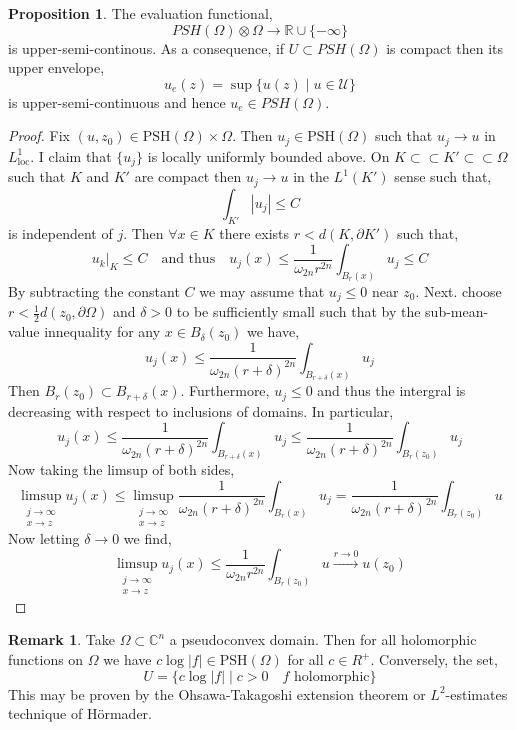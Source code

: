 \documentclass[12pt]{extarticle}
\newcommand{\R}{\mathbb{R}}
\newcommand{\C}{\mathbb{C}}
\theoremstyle{definition}
\newtheorem{proposition}[theorem]{Proposition}
\newtheorem{remark}{Remark}
\begin{document}
\begin{proposition}
The evaluation functional,
\[ PSH(\Omega) \otimes \Omega \to \R \cup \{ -\infty \} \]
is upper-semi-continous. As a consequence, if $U \subset PSH(\Omega)$ is compact then its upper envelope,
\[ u_e(z) = \sup \{ u(z) \mid u \in \mathcal{U} \} \]
is upper-semi-continuous and hence $u_e \in PSH(\Omega)$.  
\end{proposition}

\newcommand{\PSH}[1]{\mathrm{PSH}\left( #1 \right)}

\begin{proof}
Fix $(u, z_0) \in \PSH{\Omega} \times \Omega$. Then $u_j \in \PSH{\Omega}$ such that $u_j \to u$ in $L^1_{\text{loc}}$. I claim that $\{ u_j \}$ is locally uniformly bounded above. On $K \subset \subset K' \subset \subset \Omega$ such that $K$ and $K'$ are compact then $u_j \to u$ in the $L^1(K')$ sense such that,
\[ \int_{K'} |u_j| \le C \]
is independent of $j$. Then $\forall x \in K$ there exists $r < d(K, \partial K')$ such that,
\[ u_k|_K \le C \quad \text{and thus} \quad u_j(x) \le \frac{1}{\omega_{2n} r^{2n}} \int_{B_r(x)} u_j \le C \]
By subtracting the constant $C$ we may assume that $u_j \le 0$ near $z_0$. Next. choose $r < \tfrac{1}{2} d(z_0, \partial \Omega)$ and $\delta > 0$ to be sufficiently small such that by the sub-mean-value innequality for any $x \in B_\delta(z_0)$ we have,
\[ u_j(x) \le \frac{1}{\omega_{2n} (r + \delta)^{2n}} \int_{B_{r + \delta}(x)} u_j \] 
Then $B_r(z_0) \subset B_{r + \delta}(x)$. Furthermore, $u_j \le 0$ and thus the intergral is decreasing with respect to inclusions of domains. In particular,
\[ u_j(x) \le \frac{1}{\omega_{2n} (r + \delta)^{2n}} \int_{B_{r + \delta}(x)} u_j \le \frac{1}{\omega_{2n} (r + \delta)^{2n}} \int_{B_r(z_0)} u_j \] 
Now taking the limsup of both sides,
\[ \limsup_{\substack{j \to \infty \\ x \to z}} u_j(x) \le \limsup_{\substack{j \to \infty \\ x \to z}} \frac{1}{\omega_{2n} (r + \delta)^{2n}} \int_{B_r(x)} u_j = \frac{1}{\omega_{2n} (r + \delta)^{2n}} \int_{B_r(z_0)} u \]
Now letting $\delta \to 0$ we find,
\[ \limsup_{\substack{j \to \infty \\ x \to z}} u_j(x) \le \frac{1}{\omega_{2n} r^{2n}} \int_{B_r(z_0)} u \xrightarrow{r \to 0} u(z_0) \]
\end{proof}

\begin{remark}
Take $\Omega \subset \C^n$ a pseudoconvex domain. Then for all holomorphic functions on $\Omega$ we have $c \log{|f|} \in \PSH{\Omega}$ for all $c \in R^{+}$. Conversely, the set,
\[ U = \{ c \log{|f|} \mid c > 0 \quad f \text{ holomorphic} \} \]
This may be proven by the Ohsawa-Takagoshi extension theorem or $L^2$-estimates technique of H\"{o}rmader. 
\end{remark}
\end{document}
